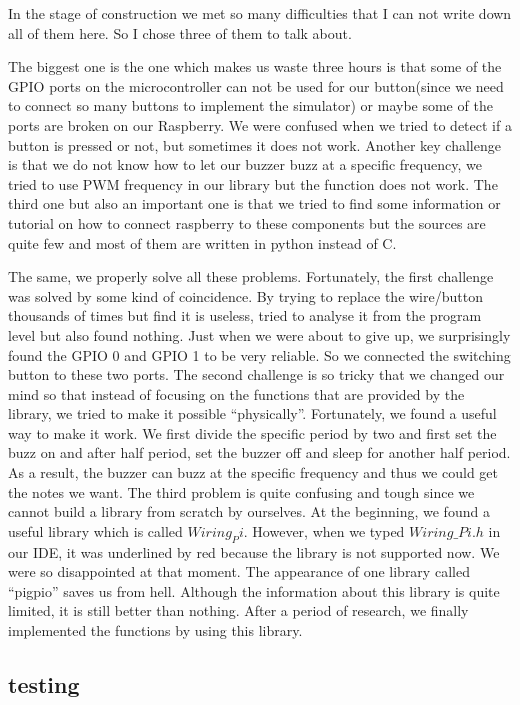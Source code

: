 \documentclass[11pt]{article}
\begin{document}
In the stage of construction we met so many difficulties that I can not write down all of them here. So I chose three of them to talk about.

The biggest one is the one which makes us waste three hours is that some of the GPIO ports on the microcontroller can not be used for our button(since we need to connect so many buttons to implement the simulator) or maybe some of the ports are broken on our Raspberry. We were confused when we tried to detect if a button is pressed or not, but sometimes it does not work. Another key challenge is that we do not know how to let our buzzer buzz at a specific frequency, we tried to use PWM frequency in our library but the function does not work. The third one but also an important one is that we tried to find some information or tutorial on how to connect raspberry to these components but the sources are quite few and most of them are written in python instead of C.

The same, we properly solve all these problems. Fortunately, the first challenge was solved by some kind of coincidence. By trying to replace the wire/button thousands of times but find it is useless, tried to analyse it from the program level but also found nothing. Just when we were about to give up, we surprisingly found the GPIO 0 and GPIO 1 to be very reliable. So we connected the switching button to these two ports. The second challenge is so tricky that we changed our mind so that instead of focusing on the functions that are provided by the library, we tried to make it possible “physically”. Fortunately, we found a useful way to make it work. We first divide the specific period by two and first set the buzz on and after half period, set the buzzer off and sleep for another half period. As a result, the buzzer can buzz at the specific frequency and thus we could get the notes we want. The third problem is quite confusing and tough since we cannot build a library from scratch by ourselves. At the beginning, we found a useful library which is called $Wiring_Pi$. However, when we typed $Wiring\_Pi.h$ in our IDE, it was underlined by red because the library is not supported now. We were so disappointed at that moment. The appearance of one library called “pigpio” saves us from hell. Although the information about this library is quite limited, it is still better than nothing. After a period of research, we finally implemented the functions by using this library. 


\subsection{testing}
\end{document}
